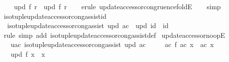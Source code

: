 \begin{isabellebody}
\ \ \ \ upd\ f\ r\ {\isacharequal}{\kern0pt}\ upd\ f{\isacharprime}{\kern0pt}\ r{\isacharprime}{\kern0pt}{\isachardoublequoteclose}\isanewline
%
\isadelimproof
\ \ %
\endisadelimproof
%
\isatagproof
{}\isamarkupfalse%
\ {\isacharparenleft}{\kern0pt}erule{\isacharparenleft}{\kern0pt}{}{\isacharparenright}{\kern0pt}\ update{\isacharunderscore}{\kern0pt}accessor{\isacharunderscore}{\kern0pt}congruence{\isacharunderscore}{\kern0pt}foldE{\isacharparenright}{\kern0pt}\isanewline
\ \ \isamarkupfalse%
\ simp\isanewline
\ \ \isamarkupfalse%
%
\endisatagproof
{\isafoldproof}%
%
\isadelimproof
\isanewline
%
\endisadelimproof
\isanewline
{}\isamarkupfalse%
\ iso{\isacharunderscore}{\kern0pt}tuple{\isacharunderscore}{\kern0pt}update{\isacharunderscore}{\kern0pt}accessor{\isacharunderscore}{\kern0pt}cong{\isacharunderscore}{\kern0pt}assist{\isacharunderscore}{\kern0pt}id{\isacharcolon}{\kern0pt}\isanewline
\ \ {\isachardoublequoteopen}iso{\isacharunderscore}{\kern0pt}tuple{\isacharunderscore}{\kern0pt}update{\isacharunderscore}{\kern0pt}accessor{\isacharunderscore}{\kern0pt}cong{\isacharunderscore}{\kern0pt}assist\ upd\ ac\ {\isasymLongrightarrow}\ upd\ id\ {\isacharequal}{\kern0pt}\ id{\isachardoublequoteclose}\isanewline
%
\isadelimproof
\ \ %
\endisadelimproof
%
\isatagproof
{}\isamarkupfalse%
\ rule\ {\isacharparenleft}{\kern0pt}simp\ add{\isacharcolon}{\kern0pt}\ iso{\isacharunderscore}{\kern0pt}tuple{\isacharunderscore}{\kern0pt}update{\isacharunderscore}{\kern0pt}accessor{\isacharunderscore}{\kern0pt}cong{\isacharunderscore}{\kern0pt}assist{\isacharunderscore}{\kern0pt}def{\isacharparenright}{\kern0pt}%
\endisatagproof
{\isafoldproof}%
%
\isadelimproof
\isanewline
%
\endisadelimproof
\isanewline
{}\isamarkupfalse%
\ update{\isacharunderscore}{\kern0pt}accessor{\isacharunderscore}{\kern0pt}noopE{\isacharcolon}{\kern0pt}\isanewline
\ \ \ uac{\isacharcolon}{\kern0pt}\ {\isachardoublequoteopen}iso{\isacharunderscore}{\kern0pt}tuple{\isacharunderscore}{\kern0pt}update{\isacharunderscore}{\kern0pt}accessor{\isacharunderscore}{\kern0pt}cong{\isacharunderscore}{\kern0pt}assist\ upd\ ac{\isachardoublequoteclose}\isanewline
\ \ \ \ \ ac{\isacharcolon}{\kern0pt}\ {\isachardoublequoteopen}f\ {\isacharparenleft}{\kern0pt}ac\ x{\isacharparenright}{\kern0pt}\ {\isacharequal}{\kern0pt}\ ac\ x{\isachardoublequoteclose}\isanewline
\ \ \ {\isachardoublequoteopen}upd\ f\ x\ {\isacharequal}{\kern0pt}\ x{\isachardoublequoteclose}\isanewline

\end{isabellebody}
